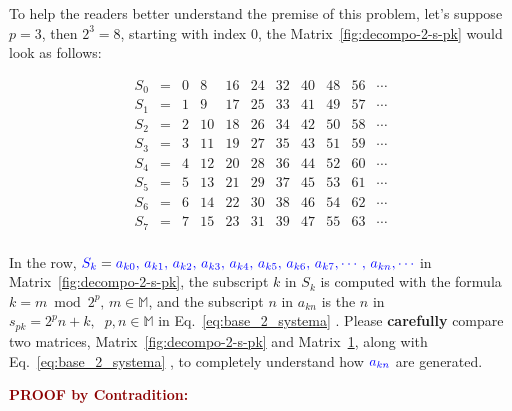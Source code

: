 \documentclass[12pt]{article}
\theoremstyle{definition} %
\numberwithin{equation}{section}
\newcommand{\getreftag}[2]{%
  Eq.~\eqref{#1#2}%
}
\newcommand{\darkboldred}[1]			   
{\textbf{\textcolor{darkred}{#1}}}
\begin{document}
\vspace{1em}
\noindent To help the readers better understand the premise of this problem, let's suppose \(p=3\), then \(2^3 = 8\), starting with index 0,  the Matrix~\ref{fig:decompo-2-s-pk} would look as follows:

\begin{figure}[H]
\centering
\captionsetup[figure]{name=Matrix}
\vspace{1em}
\begin{minipage}{0.95\linewidth}
\[
\begin{array}{ccccccccccc}
S_0 &=& 0 &  8 & 16 & 24 & 32 & 40 & 48 & 56 & \cdots \\
S_1 &=& 1 &  9 & 17 & 25 & 33 & 41 & 49 & 57 & \cdots \\
S_2 &=& 2 & 10 & 18 & 26 & 34 & 42 & 50 & 58 & \cdots \\
S_3 &=& 3 & 11 & 19 & 27 & 35 & 43 & 51 & 59 & \cdots \\
S_4 &=& 4 & 12 & 20 & 28 & 36 & 44 & 52 & 60 & \cdots \\
S_5 &=& 5 & 13 & 21 & 29 & 37 & 45 & 53 & 61 & \cdots \\
S_6 &=& 6 & 14 & 22 & 30 & 38 & 46 & 54 & 62 & \cdots \\
S_7 &=& 7 & 15 & 23 & 31 & 39 & 47 & 55 & 63 & \cdots \\
\end{array}
\]
\end{minipage}
\label{fig:decompo-2-s-3k}
\end{figure}

In the row, \(\textcolor{blue}{S_k} =\textcolor{blue}{a_{k0},\, a_{k1},\, a_{k2},\, a_{k3},\, a_{k4},\, a_{k5},\, a_{k6},\, a_{k7},
 \cdots,\,a_{kn}, \cdots}\) in Matrix~\ref{fig:decompo-2-s-pk}, the subscript \(k\) in \(S_k\) is computed with the formula \(k = m \bmod 2^p,\,m \in \mathbb{M}\), and the subscript \(n\) in \(a_{kn}\) is the \(n\) in
 \(s_{pk} = 2^pn+k,\;\;p,n \in \mathbb{M}\) in \getreftag{eq:base_2_system}{a}. Please \textbf{carefully} compare two matrices, Matrix~\ref{fig:decompo-2-s-pk} and Matrix~\ref{fig:decompo-2-s-3k}, along with \getreftag{eq:base_2_system}{a}, to completely understand how \(\textcolor{blue}{a_{kn}}\) are generated. 
 
\vspace{1em}
\noindent\darkboldred{PROOF by Contradition:}\\
\end{document}
